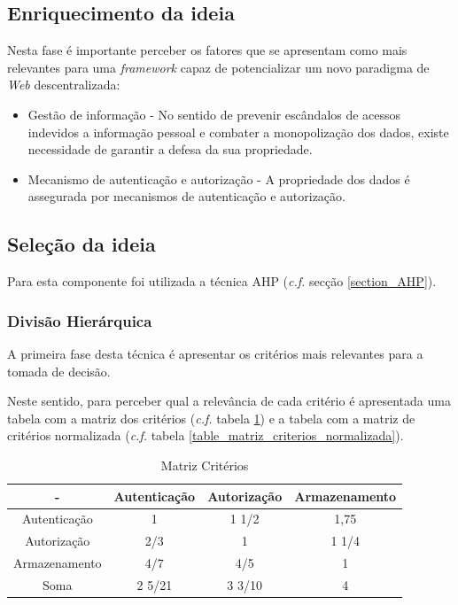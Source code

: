 \subsection{Enriquecimento da ideia}
Nesta fase é importante perceber os fatores que se apresentam como mais relevantes para uma \emph{framework} capaz de potencializar um novo paradigma de \emph{Web} descentralizada:
\begin{itemize}
\item  Gestão de informação - No sentido de prevenir escândalos de acessos indevidos a informação pessoal e combater a monopolização dos dados, existe necessidade de garantir a defesa da sua propriedade.

\item Mecanismo de autenticação e autorização - A propriedade dos dados é assegurada por mecanismos de autenticação e autorização.

\end{itemize}

\subsection{Seleção da ideia}

Para esta componente foi utilizada a técnica \acrshort{AHP} (\emph{c.f.} secção \ref{section_AHP}).

\subsubsection*{Divisão Hierárquica}

A primeira fase desta técnica é apresentar os critérios mais relevantes para a tomada de decisão.

Neste sentido, para perceber qual a relevância de cada critério é apresentada uma tabela com a matriz dos critérios (\emph{c.f.} tabela \ref{table_matriz_criterios}) e a tabela com a matriz de critérios normalizada (\emph{c.f.} tabela \ref{table_matriz_criterios_normalizada}).

\begin{table}[h]
\centering
\caption{Matriz Critérios}
\label{table_matriz_criterios}
\vspace{0.5cm}
\begin{tabular}{c|c|c|c} 
 - & Autenticação & Autorização & Armazenamento \\
\hline                          
Autenticação & 1 & 1 1/2 & 1,75 \\
Autorização &  2/3 & 1 & 1 1/4  \\
Armazenamento &  4/7 & 4/5 & 1 \\
Soma & 2 5/21 & 3 3/10 & 4 \\
\end{tabular}
\end{table}

